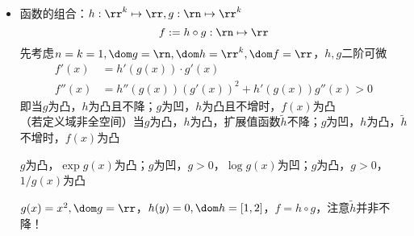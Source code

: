 \documentclass{note}
\begin{document}
\begin{itemize}
	\item 函数的组合：$h:\rr^k\mapsto\rr,g:\rn\mapsto\rr^k$
	\[f:=h\circ g:\rn\mapsto\rr\]
	先考虑$n=k=1,\dom g=\rn,\dom h=\rr^k,\dom f=\rr$，$h,g$二阶可微
	\[\begin{aligned}
	f'(x)&=h'(g(x))\cdot g'(x)\\
	f''(x)&=h''(g(x))(g'(x))^2+h'(g(x))g''(x)>0
	\end{aligned}\]
	即当$g$为凸，$h$为凸且不降；$g$为凹，$h$为凸且不增时，$f(x)$为凸\\
	（若定义域非全空间）当$g$为凸，$h$为凸，扩展值函数$\tilde{h}$不降；$g$为凹，$h$为凸，$\tilde{h}$不增时，$f(x)$为凸
	\begin{example}
	$g$为凸，$\exp g(x)$为凸；$g$为凹，$g>0$，$\log g(x)$为凹；$g$为凸，$g>0$，$1/g(x)$为凸
	\end{example}
	\begin{example}
	$g(x)=x^2,\dom g=\rr$，$h(y)=0,\dom h=[1,2]$，$f=h\circ g$，注意$\tilde{h}$并非不降！
	\end{example}
\end{itemize}
\end{document}
